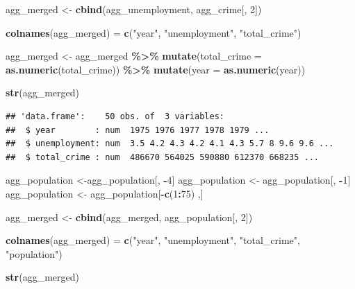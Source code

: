 \documentclass[
]{article}
\newenvironment{Shaded}{\begin{snugshade}}{\end{snugshade}}
\newcommand{\AttributeTok}[1]{\textcolor[rgb]{0.13,0.29,0.53}{#1}}
\newcommand{\DecValTok}[1]{\textcolor[rgb]{0.00,0.00,0.81}{#1}}
\newcommand{\FunctionTok}[1]{\textcolor[rgb]{0.13,0.29,0.53}{\textbf{#1}}}
\newcommand{\NormalTok}[1]{#1}
\newcommand{\OtherTok}[1]{\textcolor[rgb]{0.56,0.35,0.01}{#1}}
\newcommand{\SpecialCharTok}[1]{\textcolor[rgb]{0.81,0.36,0.00}{\textbf{#1}}}
\newcommand{\StringTok}[1]{\textcolor[rgb]{0.31,0.60,0.02}{#1}}
\begin{document}
\begin{Shaded}
\begin{Highlighting}[]
\NormalTok{agg\_merged }\OtherTok{\textless{}{-}} \FunctionTok{cbind}\NormalTok{(agg\_unemployment, agg\_crime[, }\DecValTok{2}\NormalTok{])}

\FunctionTok{colnames}\NormalTok{(agg\_merged) }\OtherTok{=} \FunctionTok{c}\NormalTok{(}\StringTok{"year"}\NormalTok{, }\StringTok{"unemployment"}\NormalTok{, }\StringTok{"total\_crime"}\NormalTok{)}

\NormalTok{agg\_merged }\OtherTok{\textless{}{-}}\NormalTok{ agg\_merged }\SpecialCharTok{\%\textgreater{}\%}
  \FunctionTok{mutate}\NormalTok{(}\AttributeTok{total\_crime =} \FunctionTok{as.numeric}\NormalTok{(total\_crime)) }\SpecialCharTok{\%\textgreater{}\%}
  \FunctionTok{mutate}\NormalTok{(}\AttributeTok{year =} \FunctionTok{as.numeric}\NormalTok{(year))}

\FunctionTok{str}\NormalTok{(agg\_merged)}
\end{Highlighting}
\end{Shaded}

\begin{verbatim}
## 'data.frame':    50 obs. of  3 variables:
##  $ year        : num  1975 1976 1977 1978 1979 ...
##  $ unemployment: num  3.5 4.2 4.3 4.2 4.1 4.3 5.7 8 9.6 9.6 ...
##  $ total_crime : num  486670 564025 590880 612370 668235 ...
\end{verbatim}

\begin{Shaded}
\begin{Highlighting}[]
\NormalTok{agg\_population }\OtherTok{\textless{}{-}}\NormalTok{agg\_population[, }\SpecialCharTok{{-}}\DecValTok{4}\NormalTok{]}
\NormalTok{agg\_population }\OtherTok{\textless{}{-}}\NormalTok{ agg\_population[, }\SpecialCharTok{{-}}\DecValTok{1}\NormalTok{]}
\NormalTok{agg\_population }\OtherTok{\textless{}{-}}\NormalTok{ agg\_population[}\SpecialCharTok{{-}}\FunctionTok{c}\NormalTok{(}\DecValTok{1}\SpecialCharTok{:}\DecValTok{75}\NormalTok{) ,]}

\NormalTok{agg\_merged }\OtherTok{\textless{}{-}} \FunctionTok{cbind}\NormalTok{(agg\_merged, agg\_population[, }\DecValTok{2}\NormalTok{])}

\FunctionTok{colnames}\NormalTok{(agg\_merged) }\OtherTok{=} \FunctionTok{c}\NormalTok{(}\StringTok{"year"}\NormalTok{, }\StringTok{"unemployment"}\NormalTok{, }\StringTok{"total\_crime"}\NormalTok{, }\StringTok{"population"}\NormalTok{)}

\FunctionTok{str}\NormalTok{(agg\_merged)}
\end{Highlighting}
\end{Shaded}
\end{document}
